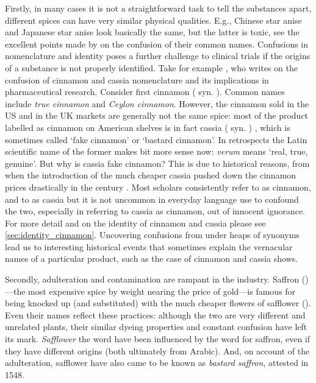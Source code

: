 Firstly, in many cases it is not a straightforward task to tell the substances apart, different spices can have very similar physical qualities. E.g., Chinese star anise  and Japanese star anise  look basically the same, but the latter is toxic, see the excellent points made by \textcite{small_confusion_1996} on the confusion of their common names. Confusions in nomenclature and identity poses a further challenge to clinical trials if the origins of a substance is not properly identified. Take for example \textcite{oketch-rabah_cinnamon_2018}, who writes on the confusion of cinnamon and cassia nomenclature and its implications in pharmaceutical research. Consider first cinnamon ( syn. ). Common names include \textit{true cinnamon} and \textit{Ceylon cinnamon}. However, the cinnamon sold in the US and in the UK markets are generally not the same spice: most of the product labelled as cinnamon on American shelves is in fact cassia ( syn. ) \autocite{oketch-rabah_cinnamon_2018}, which is sometimes called `fake cinnamon' or `bastard cinnamon'. In retrospects the Latin scientific name of the former makes bit more sense now: \textit{verum} means `real, true, genuine'. But why is cassia fake cinnamon? This is due to historical reasons, from when the introduction of the much cheaper cassia pushed down the cinnamon prices drastically in the  century \autocite{wijesekera_chemistry_1978}. Most scholars consistently refer to  as cinnamon, and to  as cassia but it is not uncommon in everyday language use to confound the two, especially in referring to cassia as cinnamon, out of innocent ignorance. For more detail and on the identity of cinnamon and cassia please see \cref{sec:identity_cinnamon}. Uncovering confusions from under heaps of synonyms lead us to interesting historical events that sometimes explain the vernacular names of a particular product, such as the case of cinnamon and cassia shows. 

Secondly, adulteration and contamination are rampant in the industry. Saffron ()---the most expensive spice by weight nearing the price of gold---is famous for being knocked up (and substituted) with the much cheaper flowers of safflower (). Even their names reflect these practices: although the two are very different and unrelated plants, their similar dyeing properties and constant confusion have left its mark. \textit{Safflower} the word have been influenced by the word for saffron, even if they have different origins (both ultimately from Arabic). And, on account of the adulteration, safflower have also came to be known as \textit{bastard saffron}, attested in 1548. 

